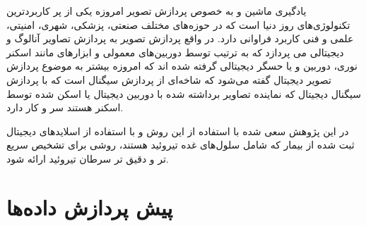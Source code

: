 
یادگیری ماشین و به خصوص پردازش تصویر امروزه یکی از پر کاربردترین تکنولوژی‌های روز دنیا است که در حوزه‌های مختلف صنعتی، پزشکی، شهری، امنیتی، علمی و فنی کاربرد فراوانی دارد.
در واقع پردازش تصویر به پردازش تصاویر آنالوگ و دیجیتالی می پردازد که به ترتیب توسط دوربین‌های معمولی و ابزارهای مانند اسکنر نوری، دوربین و یا حسگر دیجیتالی گرفته شده اند
که امروزه بیشتر به موضوع پردازش تصویر دیجیتال گفته می‌شود که شاخه‌ای از پردازش سیگنال است که با پردازش سیگنال دیجیتال که نماینده تصاویر برداشته شده با دوربین دیجیتال یا اسکن شده توسط اسکنر هستند سر و کار دارد.

در این پژوهش سعی شده با استفاده از این روش و با استفاده از اسلاید‌های دیجیتال ثبت شده از بیمار که شامل سلول‌های غده تیروئید هستند، روشی برای تشخیص سریع تر و دقیق تر سرطان تیروئید ارائه شود.


\section{پیش پردازش داده‌ها}\label{sec:پیش-پردازش-داده-ها}



